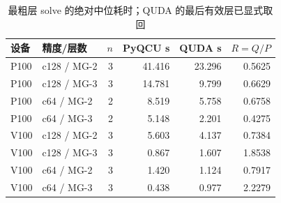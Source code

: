 \begin{table}[htbp]
\centering
\caption{最粗层 solve 的绝对中位耗时；QUDA 的最后有效层已显式取回}\label{tab:coarsest-times}
\small
\begin{tabular}{@{}llrrrr@{}}
\toprule
设备 & 精度/层数 & $n$ & PyQCU s & QUDA s & $R=Q/P$ \\
\midrule
P100 & c128 / MG-2 & 3 & 41.416 & 23.296 & 0.5625 \\
P100 & c128 / MG-3 & 3 & 14.781 & 9.799 & 0.6629 \\
P100 & c64 / MG-2 & 2 & 8.519 & 5.758 & 0.6758 \\
P100 & c64 / MG-3 & 2 & 5.148 & 2.201 & 0.4275 \\
V100 & c128 / MG-2 & 3 & 5.603 & 4.137 & 0.7384 \\
V100 & c128 / MG-3 & 3 & 0.867 & 1.607 & 1.8538 \\
V100 & c64 / MG-2 & 3 & 1.420 & 1.124 & 0.7917 \\
V100 & c64 / MG-3 & 3 & 0.438 & 0.977 & 2.2279 \\
\bottomrule
\end{tabular}
\end{table}
